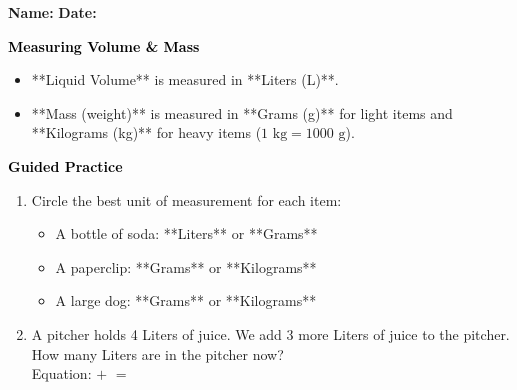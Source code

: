 \documentclass[12pt, letterpaper, fleqn]{article}
\newcommand{\blank}{\underline{\hspace{2.2cm}}}
\begin{document}
\textbf{Name:} \underline{\hspace{5cm}}
\hfill
\textbf{Date:} \underline{\hspace{3cm}}\\

\begin{tcolorbox}[colback=customteal!20]
    \large\textcolor{black}{\textbf{Measuring Volume & Mass}}
\end{tcolorbox}

\vspace{3mm}
\noindent
\begin{itemize}
    \item **Liquid Volume** is measured in **Liters (L)**.
    \item **Mass (weight)** is measured in **Grams (g)** for light items and **Kilograms (kg)** for heavy items ($1\text{ kg} = 1000\text{ g}$).
\end{itemize}

\newpage
\begin{tcolorbox}[colback=customteal!20]
    \large\textcolor{black}{\textbf{Guided Practice}}
\end{tcolorbox}

\vspace{5mm}
\begin{enumerate}[itemsep=2.5cm, leftmargin=0.6cm]
\item Circle the best unit of measurement for each item:
  \begin{itemize}[itemsep=0.8cm]
    \item A bottle of soda: **Liters** or **Grams**
    \item A paperclip: **Grams** or **Kilograms**
    \item A large dog: **Grams** or **Kilograms**
  \end{itemize}

\item A pitcher holds 4 Liters of juice. We add 3 more Liters of juice to the pitcher. How many Liters are in the pitcher now?
\\
Equation: \blank $+$ \blank $=$ \blank
\end{enumerate}
\end{document}
